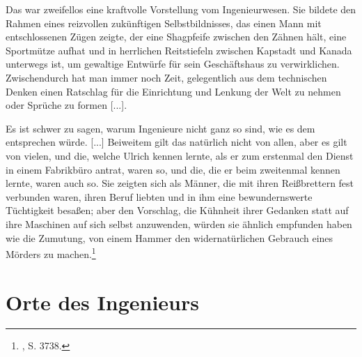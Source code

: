 \documentclass[%
	fontsize=10pt,%
	twoside,%
	headings=optiontoheadandtoc,%
	showtrims]{scrbook}
\renewenvironment{quote}{%
  \addmargin[\genericindent]{0pt}%
  \KOMAoptions{parskip=true}%
  \ifdim\parskip>0pt\else\addvspace{\intextsep}\fi
}{%
  \par
  \endaddmargin\vspace{\intextsep}
}
\renewcommand{\texttt}{\nohyphens} %
\begin{document}
\begin{quote}
\par Das war zweifellos eine kraftvolle Vorstellung vom Ingenieurwesen. Sie bildete den Rahmen eines reizvollen zukünftigen Selbstbildnisses, das einen Mann mit entschlossenen Zügen zeigte, der eine Shagpfeife zwischen den Zähnen hält, eine Sportmütze aufhat und in herrlichen Reitstiefeln zwischen Kapstadt und Kanada unterwegs ist, um gewaltige \texttt{Entwürfe} für sein Geschäftshaus zu verwirklichen. Zwischendurch hat man immer noch Zeit, gelegentlich aus dem technischen Denken einen Ratschlag für die Einrichtung und Lenkung der Welt zu nehmen oder Sprüche zu formen {[}...{]}.\par Es ist schwer zu sagen, warum Ingenieure nicht ganz so sind, wie es dem entsprechen würde. {[}...{]} Beiweitem gilt das natürlich nicht von allen, aber es gilt von vielen, und die, welche Ulrich kennen lernte, als er zum erstenmal den Dienst in einem Fabrikbüro antrat, waren so, und die, die er beim zweitenmal kennen lernte, waren auch so. Sie zeigten sich als Männer, die mit ihren Reißbrettern fest verbunden waren, ihren Beruf liebten und in ihm eine bewundernswerte Tüchtigkeit besaßen; aber den Vorschlag, die Kühnheit ihrer Gedanken statt auf ihre Maschinen auf sich selbst anzuwenden, würden sie ähnlich empfunden haben wie die Zumutung, von einem Hammer den widernatürlichen Gebrauch eines Mörders zu machen.\footnote{\cite[][]{musil2007a}, S. 37\textendash{}38.} 
\end{quote}
%
%
					
						\chapter[head={Orte des Ingenieurs}, tocentry={ORTE DES INGENIEURS}]{Orte des Ingenieurs}%
					
\end{document}
